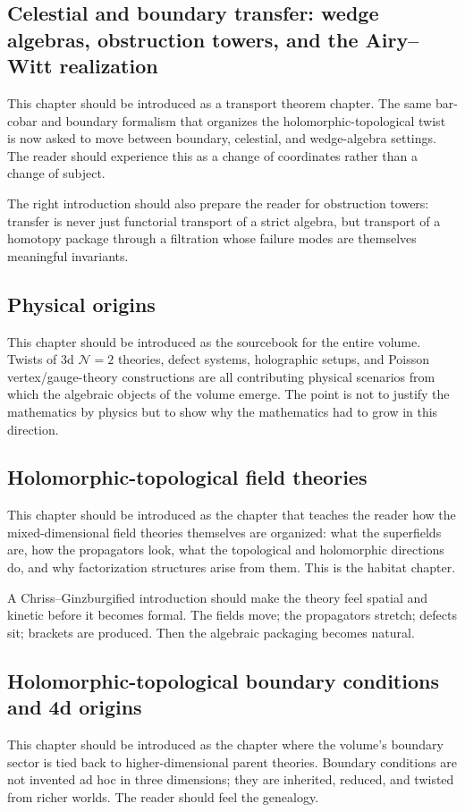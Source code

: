 \subsection*{Celestial and boundary transfer: wedge algebras, obstruction towers, and the Airy--Witt realization}
This chapter should be introduced as a transport theorem chapter.  The same bar-cobar and boundary formalism that organizes the holomorphic-topological twist is now asked to move between boundary, celestial, and wedge-algebra settings.  The reader should experience this as a change of coordinates rather than a change of subject.

The right introduction should also prepare the reader for obstruction towers: transfer is never just functorial transport of a strict algebra, but transport of a homotopy package through a filtration whose failure modes are themselves meaningful invariants.

\subsection*{Physical origins}
This chapter should be introduced as the sourcebook for the entire volume.  Twists of 3d $\mathcal N=2$ theories, defect systems, holographic setups, and Poisson vertex/gauge-theory constructions are all contributing physical scenarios from which the algebraic objects of the volume emerge.  The point is not to justify the mathematics by physics but to show why the mathematics had to grow in this direction.

\subsection*{Holomorphic-topological field theories}
This chapter should be introduced as the chapter that teaches the reader how the mixed-dimensional field theories themselves are organized: what the superfields are, how the propagators look, what the topological and holomorphic directions do, and why factorization structures arise from them.  This is the habitat chapter.

A Chriss--Ginzburgified introduction should make the theory feel spatial and kinetic before it becomes formal.  The fields move; the propagators stretch; defects sit; brackets are produced.  Then the algebraic packaging becomes natural.

\subsection*{Holomorphic-topological boundary conditions and 4d origins}
This chapter should be introduced as the chapter where the volume's boundary sector is tied back to higher-dimensional parent theories.  Boundary conditions are not invented ad hoc in three dimensions; they are inherited, reduced, and twisted from richer worlds.  The reader should feel the genealogy.

